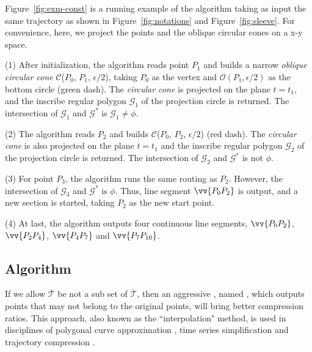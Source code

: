 \begin{example}
\label{exm-alg-conest}
Figure~\ref{fig:exm-const} is a running example of the \cist algorithm taking as input the same trajectory as shown in Figure~\ref{fig:notations} and Figure~\ref{fig:sleeve}.
For convenience, here, we project the points and the oblique circular cones on a x-y space.

\ni (1) After initialization, the \cist algorithm reads point $P_1$ and builds a narrow \emph{oblique circular cone} $\mathcal{C}$($P_0$, $P_{1}$, $\epsilon/2$), taking $P_0$ as the vertex and $\mathcal{O}(P_1, \epsilon/2)$ as the bottom circle (green dash). The \emph{circular cone} is projected on the plane $t=t_1$, and the inscribe regular polygon $\mathcal{G}_1$ of the projection circle is returned. The intersection of $\mathcal{G}_1$ and $\mathcal{G}^*$ is $\mathcal{G}_1 \ne \phi$.

\ni (2) The algorithm reads $P_2$ and builds $\mathcal{C}$($P_0$, $P_{2}$, $\epsilon/2$) (red dash). The \emph{circular cone} is also projected on the plane $t=t_1$ and the inscribe regular polygon $\mathcal{G}_2$ of the projection circle is returned. The intersection of $\mathcal{G}_2$ and $\mathcal{G}^*$ is not $\phi$.

\ni (3) For point $P_3$, the algorithm runs the same routing as $P_2$. However, the intersection of $\mathcal{G}_3$ and $\mathcal{G}^*$ is $\phi$. Thus, line segment $\vv{P_0P_2}$ is output, and a new section is started, taking $P_2$ as the new start point.

\ni (4) At last, the algorithm outputs four continuous line segments, \ie $\vv{P_0P_2}$, $\vv{P_2P_4}$, $\vv{P_4P_{7}}$ and $\vv{P_7P_{10}}$.
\end{example}






\subsection{{Algorithm \cista}}



If we allow $\overline{\mathcal{T}}$ be not a sub set of $\dddot{\mathcal{T}}$, then an aggressive \cist, named \cista, which outputs points that may not belong to the original points, will bring better compression ratios.
This approach, also known as the ``interpolation" method, is used in disciplines of \textcolor[rgb]{1.00,0.00,0.00}{polygonal curve approximation \cite{Heckbert:Survey, Zhao:Sleeve}, time series simplification and trajectory compression \cite{Lin:Operb}}.

